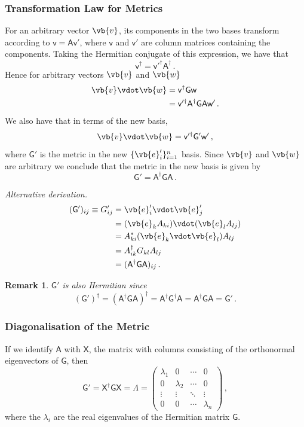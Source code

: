 \documentclass{article}
\theoremstyle{plain}\theoremheaderfont{\normalfont\itshape}\theorembodyfont{\rmfamily}\theoremseparator{.}\newtheorem*{rem}{Remark}\newtheorem*{ex}{Example}\newtheorem*{proof}{Proof}\newtheorem*{altp}{Alternative proof}
\theoremstyle{plain}\theoremheaderfont{\normalfont\bfseries}\theorembodyfont{\rmfamily}\theoremseparator{.}\newtheorem{thm}{Theorem}[section]\newtheorem{lem}[thm]{Lemma}\newtheorem{prop}[thm]{Proposition}\newtheorem*{cor}{Corollary}\newtheorem{defn}[thm]{Definition}\newtheorem{clm}[thm]{Claim}\newtheorem{clminproof}{Claim}
\theoremstyle{break}\theoremheaderfont{\normalfont\itshape}\theorembodyfont{\rmfamily}\theoremseparator{.\medskip}\newtheorem*{proofskip}{Proof}\newtheorem*{exs}{Examples}\newtheorem*{rems}{Remarks}
\theoremstyle{break}\theoremheaderfont{\normalfont\bfseries}\theorembodyfont{\rmfamily}\theoremseparator{.\medskip}\newtheorem{lemskip}[thm]{Lemma}\newtheorem{defnskip}[thm]{Definition}\newtheorem{propskip}[thm]{Proposition}\newtheorem{thmskip}[thm]{Theorem}
\numberwithin{equation}{section}
\begin{document}
	\subsubsection{Transformation Law for Metrics}
	For an arbitrary vector \(\vb{v}\), its components in the two bases transform according to \(\mathsf{v=Av'}\), where \(\mathsf{v}\) and \(\mathsf{v}'\) are column matrices containing the components. Taking the Hermitian conjugate of this expression, we have that
	\[\mathsf{v^\dagger=v'^\dagger A^\dagger}\,.\]
	Hence for arbitrary vectors \(\vb{v}\) and \(\vb{w}\)
	\begin{align*}
		\vb{v}\vdot\vb{w}&=\mathsf{v^\dagger Gw}\\
		&=\mathsf{v'^\dagger A^\dagger GAw'}\,.
	\end{align*}
	We also have that in terms of the new basis,
	\[\vb{v}\vdot\vb{w}=\mathsf{v'^\dagger G' w'}\,,\]
	where \(\mathsf{G'}\) is the metric in the new \(\{\vb{e}_i'\}_{i=1}^n\) basis. Since \(\vb{v}\) and \(\vb{w}\) are arbitrary we conclude that the metric in the new basis is given by
	\[\mathsf{G'=A^\dagger GA}\,.\]
	
	\textit{Alternative derivation.}
	\begin{align*}
		(\mathsf{G}')_{ij}\equiv G'_{ij}&=\vb{e}'_i\vdot\vb{e}'_j\\
		&=(\vb{e}_kA_{ki})\vdot(\vb{e}_lA_{lj})\\
		&=A^*_{ki}(\vb{e}_k\vdot\vb{e}_l)A_{lj}\\
		&=A_{ik}^\dagger G_{kl}A_{lj}\\
		&=(\mathsf{A^\dagger GA})_{ij}\,.
	\end{align*}
	
	\begin{rem}
		\(\mathsf{G}'\) is also Hermitian since
		\[(\mathsf{G}')^\dagger=(\mathsf{A^\dagger GA})^\dagger =\mathsf{A^\dagger G^\dagger A}=\mathsf{A^\dagger GA}=\mathsf{G}'\,.\]
	\end{rem}
	
	\subsubsection{Diagonalisation of the Metric}
	If we identify \(\mathsf{A}\) with \(\mathsf{X}\), the matrix with columns consisting of the orthonormal eigenvectors of \(\mathsf{G}\), then
	\[\mathsf{G'=X^\dagger GX=\Lambda}=\begin{pmatrix}
		\lambda_1 & 0 & \cdots & 0\\
		0 & \lambda_2 & \cdots & 0\\
		\vdots & \vdots & \ddots & \vdots\\
		0 & 0 & \cdots & \lambda_n
	\end{pmatrix}\,,\]
	where the \(\lambda_i\) are the real eigenvalues of the Hermitian matrix \(\mathsf{G}\).
	
\end{document}
